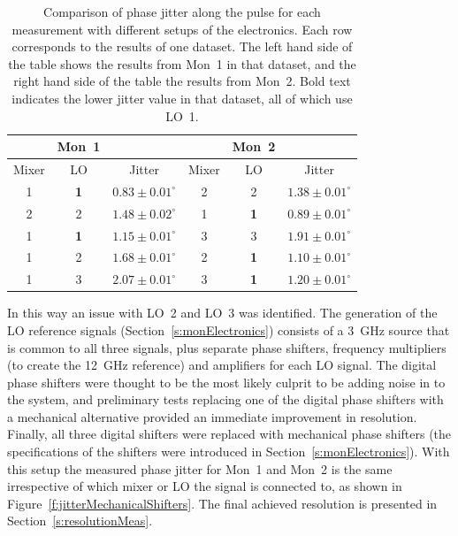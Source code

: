 \begin{table}
  \begin{center}
    \begin{tabular}{|c c c | c c c|}
	   \hline
	   & Mon~1 & & & Mon~2 & \\ \hline
      Mixer & LO & Jitter & Mixer & LO & Jitter \\ \hline
      1 & \textbf{1} & \(\mathbf{0.83\pm0.01^\circ}\) & 2 & 2 & \(1.38\pm0.01^\circ\)    \\
      2 & 2 & \(1.48\pm0.02^\circ\) & 1 & \textbf{1} & \(\mathbf{0.89\pm0.01^\circ}\)    \\ 
      1 & \textbf{1} & \(\mathbf{1.15\pm0.01^\circ}\) & 3 & 3 & \(1.91\pm0.01^\circ\)    \\ 
      1 & 2 & \(1.68\pm0.01^\circ\) & 2 & \textbf{1} & \(\mathbf{1.10\pm0.01^\circ}\)    \\ 
      1 & 3 & \(2.07\pm0.01^\circ\) & 3 & \textbf{1} & \(\mathbf{1.20\pm0.01^\circ}\)    \\  
	\hline
    \end{tabular}
    \caption{Comparison of phase jitter along the pulse for each measurement with different setups of the electronics. Each row corresponds to the results of one dataset. The left hand side of the table shows the results from Mon~1 in that dataset, and the right hand side of the table the results from Mon~2. Bold text indicates the lower jitter value in that dataset, all of which use LO~1.}
  	\label{t:elecSwapResults}
  \end{center}
\end{table}

In this way an issue with LO~2 and LO~3 was identified. The generation of the LO reference signals (Section~\ref{s:monElectronics}) consists of a 3~GHz source that is common to all three signals, plus separate phase shifters, frequency multipliers (to create the 12~GHz reference) and amplifiers for each LO signal. The digital phase shifters were thought to be the most likely culprit to be adding noise in to the system, and preliminary tests replacing one of the digital phase shifters with a mechanical alternative provided an immediate improvement in resolution. Finally, all three digital shifters were replaced with mechanical phase shifters (the specifications of the shifters were introduced in Section~\ref{s:monElectronics}). With this setup the measured phase jitter for Mon~1 and Mon~2 is the same irrespective of which mixer or LO the signal is connected to, as shown in Figure~\ref{f:jitterMechanicalShifters}. The final achieved resolution is presented in Section~\ref{s:resolutionMeas}.



